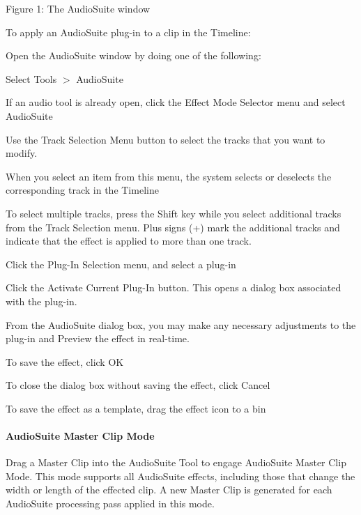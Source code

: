   Figure 1\+: The Audio\+Suite window

To apply an Audio\+Suite plug-\/in to a clip in the Timeline\+: 
\begin{DoxyEnumerate}
\item Open the Audio\+Suite window by doing one of the following\+: 
\begin{DoxyItemize}
\item Select Tools $>$ Audio\+Suite  
\item If an audio tool is already open, click the Effect Mode Selector menu and select Audio\+Suite  
\end{DoxyItemize}
\item Use the Track Selection Menu button to select the tracks that you want to modify. 
\begin{DoxyItemize}
\item When you select an item from this menu, the system selects or deselects the corresponding track in the Timeline  
\item To select multiple tracks, press the Shift key while you select additional tracks from the Track Selection menu. Plus signs (+) mark the additional tracks and indicate that the effect is applied to more than one track.  
\end{DoxyItemize}
\item Click the Plug-\/\+In Selection menu, and select a plug-\/in  
\item Click the Activate Current Plug-\/\+In button. This opens a dialog box associated with the plug-\/in.  
\end{DoxyEnumerate}

From the Audio\+Suite dialog box, you may make any necessary adjustments to the plug-\/in and Preview the effect in real-\/time. 
\begin{DoxyItemize}
\item To save the effect, click O\+K  
\item To close the dialog box without saving the effect, click Cancel  
\item To save the effect as a template, drag the effect icon to a bin  
\end{DoxyItemize}

\hypertarget{a00361_subsubsection__media_composer_guide__audiosuite_master_clip_mode}{}\paragraph{Audio\+Suite Master Clip Mode}\label{a00361_subsubsection__media_composer_guide__audiosuite_master_clip_mode}
 Drag a Master Clip into the Audio\+Suite Tool to engage Audio\+Suite Master Clip Mode. This mode supports all Audio\+Suite effects, including those that change the width or length of the effected clip. A new Master Clip is generated for each Audio\+Suite processing pass applied in this mode.

